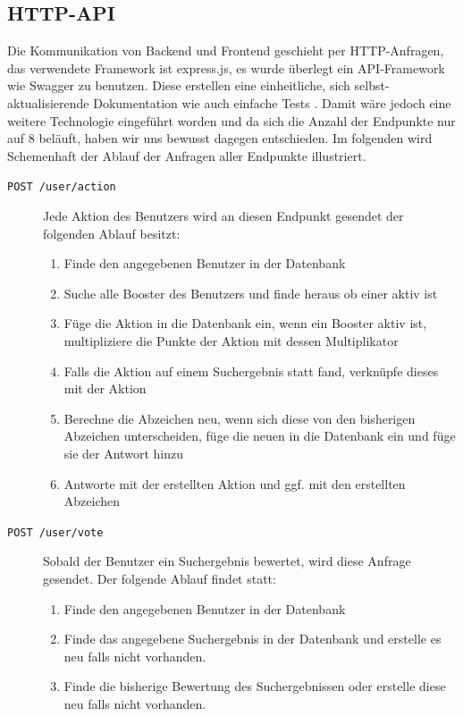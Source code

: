 \documentclass[12pt,twoside]{book}
\begin{document}
\subsection{HTTP-API}

Die Kommunikation von Backend und Frontend geschieht per HTTP-Anfragen, das verwendete Framework ist express.js, es wurde überlegt ein API-Framework wie Swagger \cite{swagger} zu benutzen. Diese erstellen eine einheitliche, sich selbst-aktualisierende Dokumentation wie auch einfache Tests \cite{haupt2014model}.
Damit wäre jedoch eine weitere Technologie eingeführt worden und da sich die Anzahl der Endpunkte nur auf 8 beläuft, haben wir uns bewusst dagegen entschieden. Im folgenden wird Schemenhaft der Ablauf der Anfragen aller Endpunkte illustriert.

\begin{description}
	\item[\texttt{POST  /user/action}] Jede Aktion des Benutzers wird an diesen Endpunkt gesendet der folgenden Ablauf besitzt:
	\begin{enumerate}
		\item Finde den angegebenen Benutzer in der Datenbank
		\item Suche alle Booster des Benutzers und finde heraus ob einer aktiv ist
		\item Füge die Aktion in die Datenbank ein, wenn ein Booster aktiv ist, multipliziere die Punkte der Aktion mit dessen Multiplikator
		\item Falls die Aktion auf einem Suchergebnis statt fand, verknüpfe dieses mit der Aktion
		\item Berechne die Abzeichen neu, wenn sich diese von den bisherigen Abzeichen unterscheiden, füge die neuen in die Datenbank ein und füge sie der Antwort hinzu
		\item Antworte mit der erstellten Aktion und ggf. mit den erstellten Abzeichen
	\end{enumerate}
	\item[\texttt{POST /user/vote}] Sobald der Benutzer ein Suchergebnis bewertet, wird diese Anfrage gesendet. Der folgende Ablauf findet statt:
	\begin{enumerate}
		\item Finde den angegebenen Benutzer in der Datenbank
		\item Finde das angegebene Suchergebnis in der Datenbank und erstelle es neu falls nicht vorhanden.
		\item Finde die bisherige Bewertung des Suchergebnissen oder erstelle diese neu falls nicht vorhanden.

\end{enumerate}
\end{description}
\end{document}
